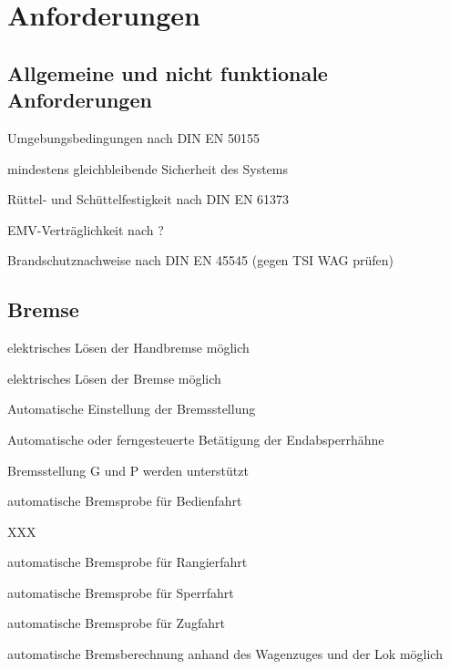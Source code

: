 \section{Anforderungen}
\subsection{Allgemeine und nicht funktionale Anforderungen}
\begin{feat}[Anf. X]
Umgebungsbedingungen nach \acrshort{DIN} \acrshort{EN} 50155
\end{feat}
\begin{feat}[Anf. X]
mindestens gleichbleibende Sicherheit des Systems
\end{feat}
\begin{feat}[Anf. X]
Rüttel- und Schüttelfestigkeit nach \acrshort{DIN} \acrshort{EN} 61373
\end{feat}
\begin{feat}
EMV-Verträglichkeit nach ?
\end{feat}
\begin{feat}
Brandschutznachweise nach \acrshort{DIN} \acrshort{EN} 45545 (gegen TSI WAG prüfen)
\end{feat}

\subsection{Bremse}
\begin{feat}[REQ. 9]
elektrisches Lösen der Handbremse möglich
\end{feat}
\begin{feat}[REQ. 10]
elektrisches Lösen der Bremse möglich
\end{feat}
\begin{feat}[REQ. 11]
Automatische Einstellung der Bremsstellung
\end{feat}
\begin{feat}[REQ. 12]
Automatische oder ferngesteuerte Betätigung der Endabsperrhähne
\end{feat}
\begin{feat}[REQ. 12]
Bremsstellung G und P werden unterstützt
\end{feat}
\begin{feat}[REQ. 13]
automatische Bremsprobe für Bedienfahrt
\end{feat}
\begin{rem}
XXX
\end{rem}
\begin{feat}
automatische Bremsprobe für Rangierfahrt
\end{feat}
\begin{feat}
automatische Bremsprobe für Sperrfahrt
\end{feat}
\begin{feat}
automatische Bremsprobe für Zugfahrt
\end{feat}
\begin{feat}
automatische Bremsberechnung anhand des Wagenzuges und der Lok möglich
\end{feat}

